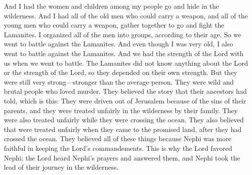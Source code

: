 And I had the women and children among my people go and hide in the wilderness. And I had all of the old men who could carry a weapon, and all of the young men who could carry a weapon, gather together to go and fight the Lamanites. I organized all of the men into groups, according to their age.
\bverse \iffalse And it came to pass that we did go up to battle against the Lamanites; and I, even I, in my old age, did go up to battle against the Lamanites. And it came to pass that we did go up in the strength of the Lord to battle. \fi
So we went to battle against the Lamanites. And even though I was very old, I also went to battle against the Lamanites. And we had the strength of the Lord with us when we went to battle.
\bverse \iffalse Now, the Lamanites knew nothing concerning the Lord, nor the strength of the Lord, therefore they depended upon their own strength. Yet they were a strong people, as to the strength of men. \fi
The Lamanites did not know anything about the Lord or the strength of the Lord, so they depended on their own strength. But they were still very strong---stronger than the average person.
\bverse \iffalse They were a wild, and ferocious, and a blood-thirsty people, believing in the tradition of their fathers, which is this--Believing that they were driven out of the land of Jerusalem because of the iniquities of their fathers, and that they were wronged in the wilderness by their brethren, and they were also wronged while crossing the sea; \fi
They were wild and brutal people who loved murder. They believed the story that their ancestors had told, which is this: They were driven out of Jerusalem because of the sins of their parents, and they were treated unfairly in the wilderness by their family. They were also treated unfairly while they were crossing the ocean.
\bverse \iffalse And again, that they were wronged while in the land of their first inheritance, after they had crossed the sea, and all this because that Nephi was more faithful in keeping the commandments of the Lord--therefore he was favored of the Lord, for the Lord heard his prayers and answered them, and he took the lead of their journey in the wilderness. \fi
They also believed that were treated unfairly when they came to the promised land, after they had crossed the ocean. They believed all of these things because Nephi was more faithful in keeping the Lord's commandements. This is why the Lord favored Nephi; the Lord heard Nephi's prayers and answered them, and Nephi took the lead of their journey in the wilderness.
